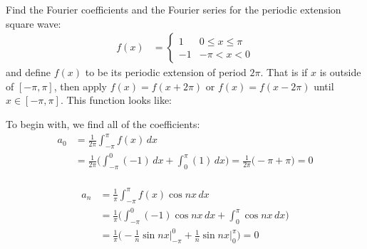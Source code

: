 \begin{example} \label{ex:FS:square:wave}
Find the Fourier coefficients and the Fourier series for the periodic extension square wave:
% 
\begin{align*}
f(x) & = \begin{cases}
1 & 0 \leq x \leq \pi \\
-1 & -\pi < x < 0 
\end{cases}
\end{align*}
and define $f(x)$ to be its periodic extension of period $2\pi$.  That is if $x$ is outside of $[-\pi,\pi]$, then apply $f(x) = f(x+2\pi)$ or $f(x) = f(x-2\pi)$ until $x \in [-\pi,\pi]$.  This function looks like:
%
\begin{center}
\end{center}

\solution


To begin with, we find all of the coefficients:
% 
\begin{align*}
a_0 & = \frac{1}{2\pi} \int_{-\pi}^{\pi} f(x) \, dx \\
& = \frac{1}{2\pi} \biggl( \int_{-\pi}^0 (-1) \, dx + \int_0^{\pi} (1) \, dx \biggr) = \frac{1}{2\pi} \bigl( -\pi + \pi) = 0 \\
\end{align*}

\begin{align*}
a_n & = \frac{1}{\pi} \int_{-\pi}^{\pi} f(x) \cos nx  \, dx \\
& = \frac{1}{\pi} \biggl( \int_{-\pi}^0 (-1) \cos nx  \, dx + \int_0^{\pi} \cos nx  \, dx \biggr) \\
& = \frac{1}{\pi} \biggl( -\frac{1}{n} \sin nx \biggr\vert_{-\pi}^0 + \frac{1}{n} \sin nx \biggr\vert_{0}^{\pi}  \biggr)  = 0
\end{align*}



\end{example}
